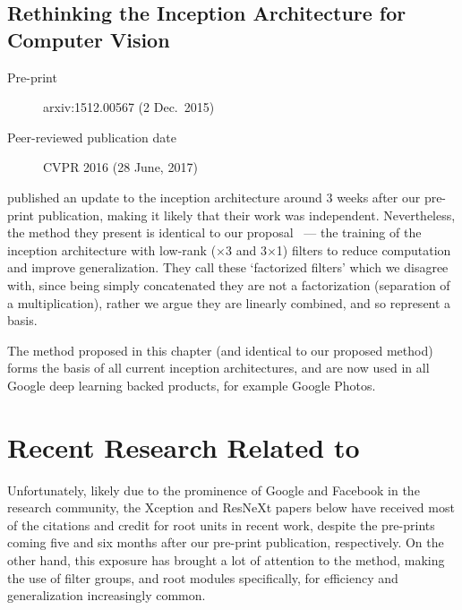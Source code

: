 \documentclass[thesis]{subfiles}
\begin{document}
\subsection*{Rethinking the Inception Architecture for Computer Vision}
\begin{description}
    \item[Pre-print] arxiv:1512.00567 (2 Dec.\ 2015)
    \item[Peer-reviewed publication date] CVPR 2016 (28 June, 2017)
\end{description}
 published an update to the \Gls{inception} architecture around 3 weeks after our pre-print publication, making it likely that their work was independent. Nevertheless, the method they present is identical to our proposal~\citep{Ioannou2016} --- the training of the \Gls{inception} architecture with low-rank ($\times$3 and 3$\times$1) filters to reduce computation and improve generalization. They call these `factorized filters' which we disagree with, since being simply concatenated they are not a factorization (\ie separation of a multiplication), rather we argue they are linearly combined, and so represent a basis.

The method proposed in this chapter (and identical to our proposed method) forms the basis of all current \Gls{inception} architectures, and are now used in all Google deep learning backed products, for example Google Photos\texttrademark.

\section{Recent Research Related to }
Unfortunately, likely due to the prominence of Google and Facebook in the research community, the Xception and ResNeXt papers below have received most of the citations and credit for root units in recent work, despite the pre-prints coming five and six months after our pre-print publication, respectively. On the other hand, this exposure has brought a lot of attention to the method, making the use of filter groups, and root modules specifically, for efficiency and generalization increasingly common. 
\end{document}
